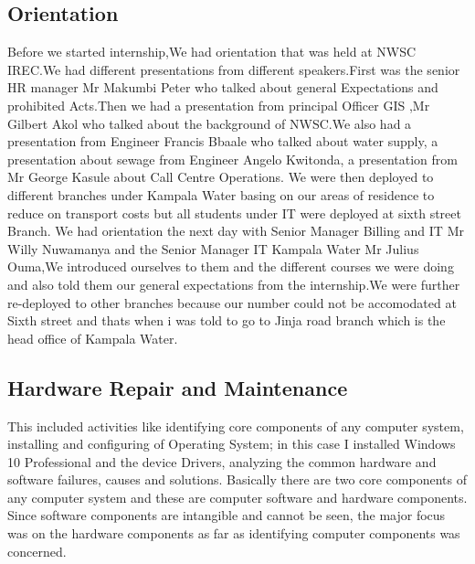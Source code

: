 \documentclass{article}
\begin{document}
 \subsection{Orientation}
Before we started internship,We had orientation that was held at NWSC IREC.We had different presentations from different speakers.First was the senior HR manager Mr Makumbi Peter who talked about general Expectations and prohibited Acts.Then we had a presentation from principal Officer GIS ,Mr Gilbert Akol who talked about the background of  NWSC.We also had a presentation from Engineer Francis Bbaale who talked about water supply, a presentation about sewage from Engineer Angelo Kwitonda, a presentation from Mr George Kasule about Call Centre Operations. We were then deployed to different branches under Kampala Water basing on our areas of residence to reduce on transport costs but all students under IT were deployed at sixth street Branch. We had orientation the next day with Senior Manager Billing and IT Mr Willy Nuwamanya and the Senior Manager IT Kampala Water Mr Julius Ouma,We introduced ourselves to them and the different courses we were doing and also told them our general expectations from the internship.We were further re-deployed to other branches because our number could not be accomodated at Sixth street and thats when i was told to go to Jinja road branch which is the head office of Kampala Water.
\subsection{Hardware Repair and Maintenance }
This included activities like identifying core components of any computer system, installing and configuring of Operating System; in this case I installed Windows 10 Professional and the device Drivers, analyzing the common hardware and software failures, causes and solutions. Basically there are two core components of any computer system and these are
computer software and hardware components. Since software components are intangible and cannot be seen, the major focus was on the hardware components as far as identifying computer components was concerned.
\end{document}
